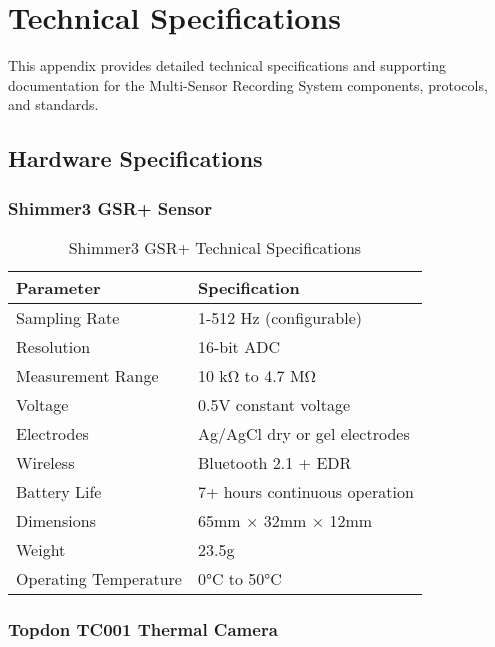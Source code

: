 \section{Technical Specifications}

This appendix provides detailed technical specifications and supporting documentation for the Multi-Sensor Recording System components, protocols, and standards.

\subsection{Hardware Specifications}

\subsubsection{Shimmer3 GSR+ Sensor}

\begin{table}[htbp]
\centering
\caption{Shimmer3 GSR+ Technical Specifications}
\begin{tabular}{|l|l|}
\hline
\textbf{Parameter} & \textbf{Specification} \\
\hline
Sampling Rate & 1-512 Hz (configurable) \\
Resolution & 16-bit ADC \\
Measurement Range & 10 kΩ to 4.7 MΩ \\
Voltage & 0.5V constant voltage \\
Electrodes & Ag/AgCl dry or gel electrodes \\
Wireless & Bluetooth 2.1 + EDR \\
Battery Life & 7+ hours continuous operation \\
Dimensions & 65mm × 32mm × 12mm \\
Weight & 23.5g \\
Operating Temperature & 0°C to 50°C \\
\hline
\end{tabular}
\end{table}

\subsubsection{Topdon TC001 Thermal Camera}


